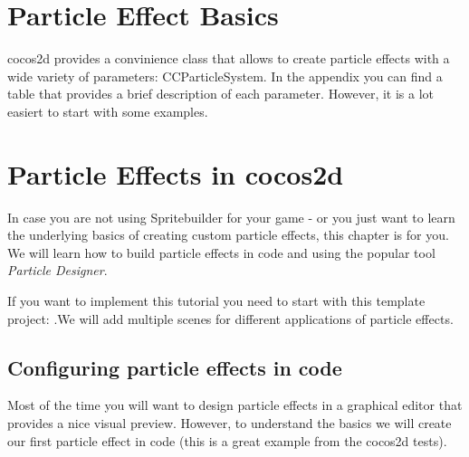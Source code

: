 \documentclass{scrreprt}
\newcommand{\cocos}{cocos2d}
\begin{document}
\section{Particle Effect Basics}
\cocos{} provides a convinience class that allows to create particle effects
with a wide variety of parameters: CCParticleSystem.
In the appendix you can find a table that provides a brief description of each
parameter. However, it is a lot easiert to start with some examples.
\section{Particle Effects in \cocos{}}
In case you are not using Spritebuilder for your game - or you just want to
learn the underlying basics of creating custom particle effects, this chapter is
for you. We will learn how to build particle effects in code and using the
popular tool \textit{Particle Designer}.
\begin{lamp}[frametitle={Following this tutorial}]
If you want to implement this tutorial you need to start with this template
project: .We will add multiple scenes for different applications of particle
effects.
\end{lamp}
\label{subsec:particle effects in code}
\subsection{Configuring particle effects in code}
Most of the time you will want to design particle effects in a graphical editor
that provides a nice visual preview. However, to understand the basics we will
create our first particle effect in code (this is a great example from 
the cocos2d tests).
\end{document}
